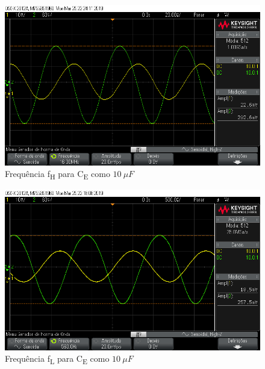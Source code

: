 \documentclass[journal, a4paper]{IEEEtran}
\begin{document}
    \begin{figure}[H]
      \begin{center}
      \includegraphics[width=\columnwidth]{FH.png}
      \caption{Frequência f\textsubscript{H} para C\textsubscript{E} como $10 \: \mu F$}
      \label{FH}
      \end{center}
    \end{figure}  
    
    \begin{figure}[H]
        \begin{center}
        \includegraphics[width=\columnwidth]{FL.png}
        \caption{Frequência f\textsubscript{L} para C\textsubscript{E} como $10 \: \mu F$}
        \label{FL}
        \end{center}
    \end{figure}
    
\end{document}
